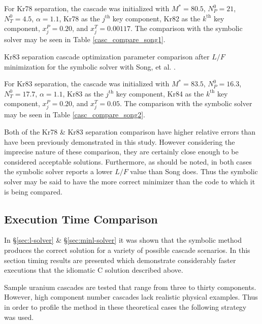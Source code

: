 \documentclass[preprint,12pt]{elsarticle}
\newcommand{\nuc}[2]{{#1}{#2}}
\newcommand{\jth}[0]{$j^{\mbox{th}}$ }
\newcommand{\kth}[0]{$k^{\mbox{th}}$ }
\begin{document}
For \nuc{Kr}{78} separation, the cascade was initialized with $M^*=80.5$, 
$N_P^0=21$, $N_T^0=4.5$, $\alpha=1.1$, \nuc{Kr}{78} as the \jth key
component, \nuc{Kr}{82} as the \kth key component, $x_j^P=0.20$, and
$x_j^T=0.00117$.  The comparison with the symbolic solver may be seen in Table
\ref{casc_compare_song1}.

\begin{table}[htbp]
\begin{center}
\caption{\nuc{Kr}{83} separation cascade optimization parameter comparison after 
    $L/F$ minimization for the symbolic 
    solver with Song, et al. \cite{doi:10.1080/01496391003793884}.}

\label{casc_compare_song2}
\end{center}
\end{table}

For \nuc{Kr}{83} separation, the cascade was initialized with $M^*=83.5$, 
$N_P^0=16.3$, $N_T^0=17.7$, $\alpha=1.1$, \nuc{Kr}{83} as the \jth key
component, \nuc{Kr}{84} as the \kth key component, $x_j^P=0.20$, and
$x_j^T=0.05$.  The comparison with the symbolic solver may be seen in Table
\ref{casc_compare_song2}.

Both of the \nuc{Kr}{78} \&  \nuc{Kr}{83} separation comparison have higher 
relative errors than have been previously demonstrated in this study.  
However considering the imprecise nature of these comparison, 
they are certainly close enough to be considered acceptable solutions.  
Furthermore, as should be noted, in both cases the symbolic solver reports a 
lower $L/F$ value than Song does.  Thus the symbolic solver may be said to have
the more correct minimizer than the code to which it is being compared.

\subsection{Execution Time Comparison}
\label{sec:timings-solver}

In \S\ref{sec:l-solver} \& \S\ref{sec:minl-solver} it was shown that the symbolic 
method produces the correct solution for a variety of possible cascade scenarios.
In this section timing results are presented which demonstrate considerably faster
executions that the idiomatic C solution described above.

Sample uranium cascades are tested that range from three to thirty components.  
However, high component number cascades lack realistic physical examples.  
Thus in order to profile the method in these theoretical cases the following strategy
was used.
\end{document}
